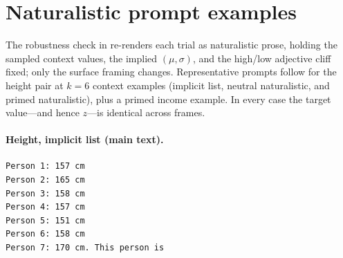 \documentclass{article}
\newcommand{\primalz}{\ensuremath{d_{z}}}
\begin{document}




\section{Naturalistic prompt examples}
\label{app:naturalistic-prompts}

The robustness check in  re-renders each trial as naturalistic
prose, holding the sampled context values, the implied $(\mu,\sigma)$, and the high/low adjective
cliff fixed; only the surface framing changes. Representative prompts follow for the height pair at
$k=6$ context examples (implicit list, neutral naturalistic, and primed naturalistic), plus a primed
income example. In every case the target value---and hence $z$---is identical across frames.

\paragraph{Height, implicit list (main text).}
{\small\begin{verbatim}
Person 1: 157 cm
Person 2: 165 cm
Person 3: 158 cm
Person 4: 157 cm
Person 5: 151 cm
Person 6: 158 cm
Person 7: 170 cm. This person is
\end{verbatim}}
\end{document}
